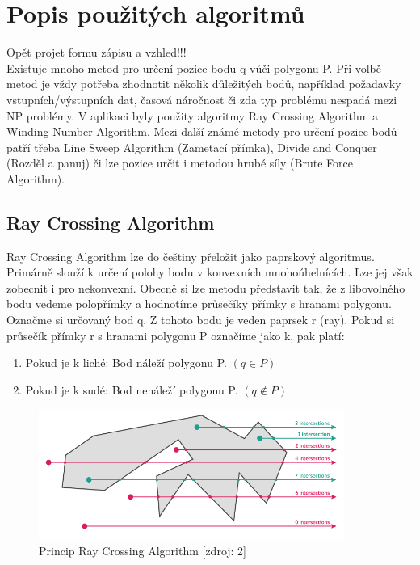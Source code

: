 \documentclass[a4paper, 12pt]{article}
\begin{document}
\section{Popis použitých algoritmů}
Opět projet formu zápisu a vzhled!!!\\

Existuje mnoho metod pro určení pozice bodu q vůči polygonu P. Při volbě metod je vždy potřeba zhodnotit několik důležitých bodů, například požadavky vstupních/výstupních dat, časová náročnost či zda typ problému nespadá mezi NP problémy. V aplikaci byly použity algoritmy Ray Crossing Algorithm a Winding Number Algorithm. Mezi další známé metody pro určení pozice bodů patří třeba Line Sweep Algorithm (Zametací přímka), Divide and Conquer (Rozděl a panuj) či lze pozice určit i metodou hrubé síly (Brute Force Algorithm).

\subsection{Ray Crossing Algorithm}
Ray Crossing Algorithm lze do češtiny přeložit jako paprskový algoritmus. Primárně slouží k určení polohy bodu v konvexních mnohoúhelnících. Lze jej však zobecnit i pro nekonvexní. Obecně si lze metodu představit tak, že z libovolného bodu vedeme polopřímky a hodnotíme průsečíky přímky s hranami polygonu. \\

Označme si určovaný bod q. Z tohoto bodu je veden paprsek r (ray). Pokud si průsečík přímky r s hranami polygonu P označíme jako k, pak platí:
\begin{enumerate}
\item Pokud je k liché: Bod náleží polygonu P. $(q\in P)$ 
\item Pokud je k sudé: Bod nenáleží polygonu P.  $(q {\not \in} P)$ 
\end{enumerate}

\begin{figure}[h]
	\centering
	\includegraphics[width=10cm]{ray.png}
	\caption{Princip Ray Crossing Algorithm [zdroj: 2]}
\end{figure}
\end{document}
